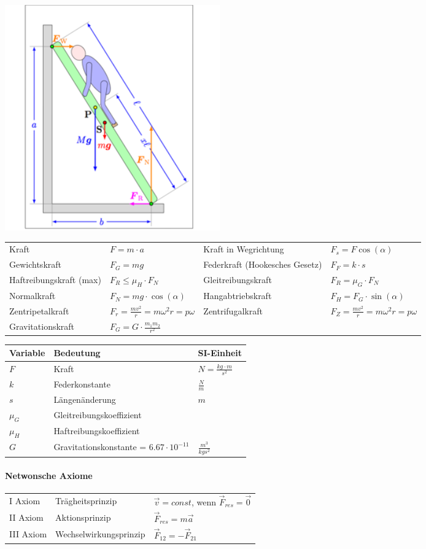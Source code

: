 \includegraphics[width=0.3\linewidth]{images/leiter_kraefte}


\begin{tabbing}
	\begin{tabu} to \linewidth {X l X l}
		\toprule
		Kraft & $F = m \cdot a$ & 
		Kraft in Wegrichtung & $F_s = F \cos(\alpha)$ \\
		Gewichtskraft & $F_G = mg$  &
		Federkraft (Hookesches Gesetz) & $F_F = k\cdot s$ \\
		Haftreibungskraft (max) & $F_R \leq \mu_H \cdot F_N$ &
		Gleitreibungskraft & $F_R = \mu_G \cdot F_N$ \\
		Normalkraft & $F_N = mg\cdot \cos(\alpha)$ &
		Hangabtriebskraft & $F_H = F_G \cdot \sin(\alpha)$  \\
		Zentripetalkraft & $F_r = \frac{mv^2}{r} = m\omega^2r = p\omega$ & 
		Zentrifugalkraft & $F_Z = \frac{mv^2}{r} = m\omega^2r = p\omega$ \\
		Gravitationskraft & $F_G = G \cdot \frac{m_1m_2}{r^2}$
	\end{tabu}
\end{tabbing}

\begin{tabbing}
	\begin{tabu} to \linewidth {l X l}
		Variable & Bedeutung & SI-Einheit \\
		\midrule
		$F$ & Kraft & $N = \frac{kg \cdot m}{s^2}$\\ 
		$k$ & Federkonstante & $\frac{N}{m}$ \\
		$s$ & Längenänderung & $m$ \\
		$\mu_G$ & Gleitreibungskoeffizient &  \\
		$\mu_H$ & Haftreibungskoeffizient &  \\
		$G$ & Gravitationskonstante = $6.67 \cdot 10^{-11}$ & $\frac{m^3}{kg s^2}$ \\
		\bottomrule
	\end{tabu}
\end{tabbing}

\paragraph{Netwonsche Axiome}

\begin{tabbing}
	\begin{tabu} to \linewidth {l l X}
		\toprule
		I Axiom & Trägheitsprinzip & $\vec{v} = const$, wenn $ \vec{F}_{res} = \vec{0}$ \\
		II Axiom & Aktionsprinzip & $\vec{F}_{res} = m\vec{a}$\\ 
		III Axiom & Wechselwirkungsprinzip & $\vec{F}_{12} = - \vec{F}_{21}$ \\
		\bottomrule
	\end{tabu}
\end{tabbing}